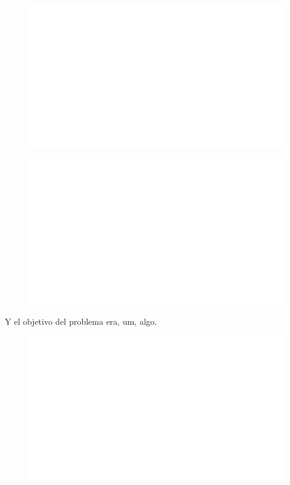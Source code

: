 \begin{centering}
    \begin{figure}[h]
        \centering
        \includegraphics[width=\textwidth]{whyareyoucheckingthenameofthisfile.png}
    \end{figure}
\end{centering}

\begin{centering}
    \begin{figure}
        \centering
        \includegraphics[width=\textwidth]{whyareyoucheckingthenameofthisfile.png}
    \end{figure}
\end{centering}
\noindent

Y el objetivo del problema era, um, algo.

\begin{centering}
    \begin{figure}[h]
        \centering
        \includegraphics[width=\textwidth]{whyareyoucheckingthenameofthisfile.png}
    \end{figure}
\end{centering}

